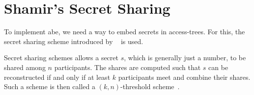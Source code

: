 





\section{Shamir's Secret Sharing}
To implement \acrshort{abe}, we need a way to embed secrets in \glspl{access-tree}.
For this, the secret sharing scheme introduced by \citeauthor{shamir_how_1979}~\cite{shamir_how_1979} is used.

Secret sharing schemes allows a secret $s$, which is generally just a number, to be shared among $n$ participants.
The shares are computed such that $s$ can be reconstructed if and only if at least $k$ participants meet and combine their shares.
Such a scheme is then called a $(k,n)$-threshold scheme~\cite{shamir_how_1979}.

